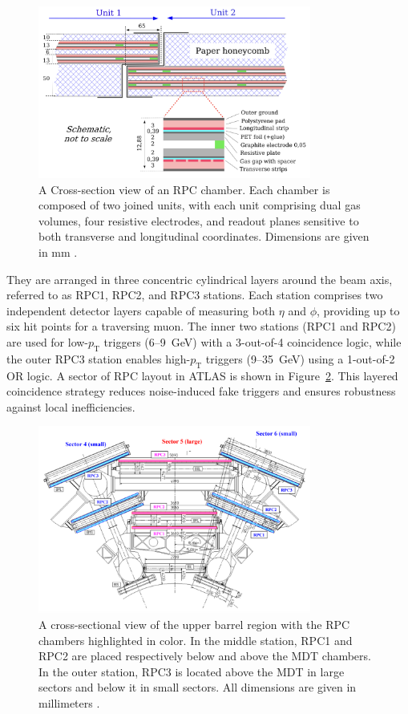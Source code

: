 \begin{figure}[htbp]
  \centering
  \includegraphics[width=0.8\textwidth]{figs/chapter2/RPC_cross_section.png}
  \caption{A Cross-section view of an RPC chamber. Each chamber is composed of two joined units, with each unit comprising dual gas volumes, four resistive electrodes, and readout planes sensitive to both transverse and longitudinal coordinates. Dimensions are given in mm \cite{ATLASDetector2008}.}
  \label{fig:RPC_cross_section}
\end{figure}

They are arranged in three concentric cylindrical layers around the beam axis, referred to as RPC1, RPC2, and RPC3 stations. Each station comprises two independent detector layers capable of measuring both $\eta$ and $\phi$, providing up to six hit points for a traversing muon. The inner two stations (RPC1 and RPC2) are used for low-$p_\mathrm{T}$ triggers (6--9~GeV) with a 3-out-of-4 coincidence logic, while the outer RPC3 station enables high-$p_\mathrm{T}$ triggers (9--35~GeV) using a 1-out-of-2 OR logic. A sector of RPC layout in ATLAS is shown in Figure~\ref{fig:RPC_layout}. This layered coincidence strategy reduces noise-induced fake triggers and ensures robustness against local inefficiencies. 

\begin{figure}[htbp]
  \centering
  \includegraphics[width=0.8\textwidth]{figs/chapter2/RPC_layout.png}
  \caption{A cross-sectional view of the upper barrel region with the RPC chambers highlighted in color. In the middle station, RPC1 and RPC2 are placed respectively below and above the MDT chambers. In the outer station, RPC3 is located above the MDT in large sectors and below it in small sectors. All dimensions are given in millimeters \cite{ATLASDetector2008}.}
  \label{fig:RPC_layout}
\end{figure}

